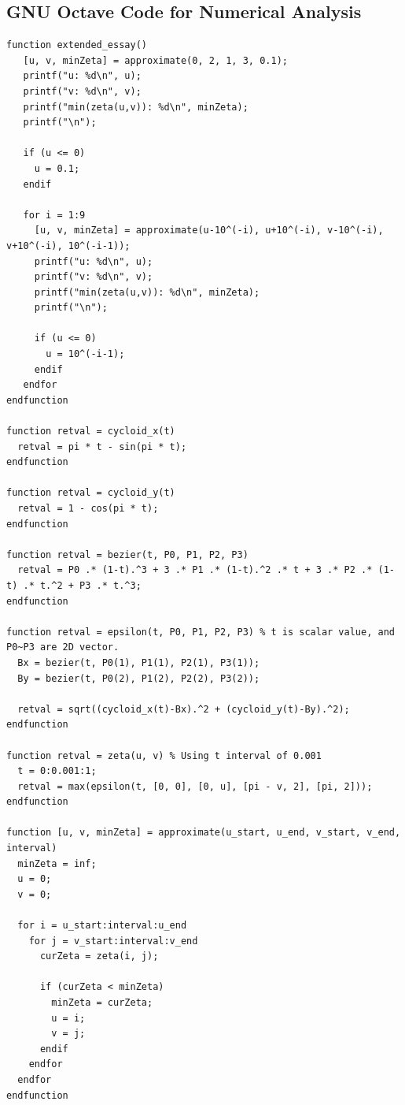 \documentclass[11pt, oneside, appendixprefix=Appendix]{article}
\theoremstyle{definition}
\numberwithin{figure}{section}
\begin{document}
\begin{appendices}
\section{GNU Octave Code for Numerical Analysis}

\begin{verbatim}
function extended_essay()
   [u, v, minZeta] = approximate(0, 2, 1, 3, 0.1);
   printf("u: %d\n", u);
   printf("v: %d\n", v);
   printf("min(zeta(u,v)): %d\n", minZeta);
   printf("\n");
   
   if (u <= 0)
     u = 0.1;
   endif
   
   for i = 1:9
     [u, v, minZeta] = approximate(u-10^(-i), u+10^(-i), v-10^(-i), v+10^(-i), 10^(-i-1));
     printf("u: %d\n", u);
     printf("v: %d\n", v);
     printf("min(zeta(u,v)): %d\n", minZeta);
     printf("\n");
     
     if (u <= 0)
       u = 10^(-i-1);
     endif
   endfor
endfunction

function retval = cycloid_x(t)
  retval = pi * t - sin(pi * t);
endfunction

function retval = cycloid_y(t)
  retval = 1 - cos(pi * t);
endfunction

function retval = bezier(t, P0, P1, P2, P3)
  retval = P0 .* (1-t).^3 + 3 .* P1 .* (1-t).^2 .* t + 3 .* P2 .* (1-t) .* t.^2 + P3 .* t.^3;
endfunction

function retval = epsilon(t, P0, P1, P2, P3) % t is scalar value, and P0~P3 are 2D vector.
  Bx = bezier(t, P0(1), P1(1), P2(1), P3(1));
  By = bezier(t, P0(2), P1(2), P2(2), P3(2));
  
  retval = sqrt((cycloid_x(t)-Bx).^2 + (cycloid_y(t)-By).^2);
endfunction

function retval = zeta(u, v) % Using t interval of 0.001
  t = 0:0.001:1;
  retval = max(epsilon(t, [0, 0], [0, u], [pi - v, 2], [pi, 2]));
endfunction

function [u, v, minZeta] = approximate(u_start, u_end, v_start, v_end, interval)
  minZeta = inf;
  u = 0;
  v = 0;
  
  for i = u_start:interval:u_end
    for j = v_start:interval:v_end
      curZeta = zeta(i, j);
      
      if (curZeta < minZeta)
        minZeta = curZeta;
        u = i;
        v = j;
      endif
    endfor
  endfor
endfunction
\end{verbatim}

\end{appendices}
\end{document}
